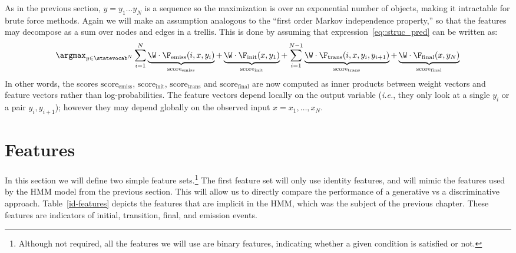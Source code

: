 As in the previous section, $y = y_1\ldots y_N$ is a sequence so the maximization
is over an exponential number of objects, making it intractable for brute force methods. Again
we will make an assumption analogous to the ``first order Markov independence property,'' so that the
features may decompose as a sum over nodes and edges in a trellis. 
This is done by assuming that expression~\ref{eq::struc_pred} can be written as:
\begin{equation}
\argmax_{y \in \statevocab^N} 
\sum_{i=1}^N \underbrace{\W \cdot \F_{\mathrm{emiss}}(i,x,y_i)}_{\mathrm{score}_{\mathrm{emiss}}}  + 
\underbrace{\W \cdot \F_{\mathrm{init}}(x,y_1)}_{\mathrm{score}_{\mathrm{init}}}  + 
\sum_{i=1}^{N-1} \underbrace{\W \cdot \F_{\mathrm{trans}}(i,x,y_i,y_{i+1})}_{\mathrm{score}_{\mathrm{trans}}}+ 
\underbrace{\W \cdot \F_{\mathrm{final}}(x,y_N)}_{\mathrm{score}_{\mathrm{final}}}
\label{eq::struc_pred_decompose}
\end{equation}
In other words, the scores ${\mathrm{score}_{\mathrm{emiss}}}$, 
${\mathrm{score}_{\mathrm{init}}}$, ${\mathrm{score}_{\mathrm{trans}}}$
and ${\mathrm{score}_{\mathrm{final}}}$ are now computed as inner products 
between weight vectors and feature vectors rather than log-probabilities.
The feature vectors depend locally on the output variable 
(\emph{i.e.}, they only look at a single $y_i$ or a pair $y_i,y_{i+1}$);
however they may depend globally on the observed input $x=x_{1},\ldots,x_{N}$.


\section{\label{seq::features} Features}

In this section we will define two simple feature sets.\footnote{Although not required, all the features we will use are binary features, indicating whether a given condition 
is satisfied or not.} The first feature set
will only use identity features, and will mimic the features used by
the HMM model from the previous section. This will allow us to directly
compare the performance of a generative vs a discriminative
approach. %
Table~\ref{id-features} depicts the features that are implicit in the HMM, which was the subject of 
the previous chapter. These features are indicators of initial, transition, final, and emission events.

